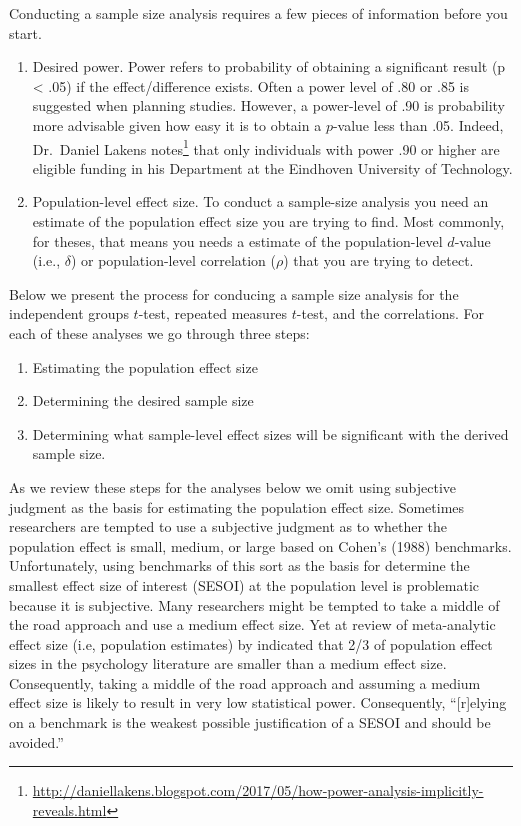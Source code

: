 \documentclass[
]{krantz}
\providecommand{\tightlist}{%
  \setlength{\itemsep}{0pt}\setlength{\parskip}{0pt}}
\renewcommand{\href}[2]{#2\footnote{\url{#1}}}
\begin{document}
Conducting a sample size analysis requires a few pieces of information before you start.

\begin{enumerate}
\def\labelenumi{\arabic{enumi}.}
\item
  Desired power. Power refers to probability of obtaining a significant result (p \textless{} .05) if the effect/difference exists. Often a power level of .80 or .85 is suggested when planning studies. However, a power-level of .90 is probability more advisable given how easy it is to obtain a \(p\)-value less than .05. Indeed, Dr.~Daniel Lakens \href{http://daniellakens.blogspot.com/2017/05/how-power-analysis-implicitly-reveals.html}{notes} that only individuals with power .90 or higher are eligible funding in his Department at the Eindhoven University of Technology.
\item
  Population-level effect size. To conduct a sample-size analysis you need an estimate of the population effect size you are trying to find. Most commonly, for theses, that means you needs a estimate of the population-level \(d\)-value (i.e., \(\delta\)) or population-level correlation (\(\rho\)) that you are trying to detect.
\end{enumerate}

Below we present the process for conducing a sample size analysis for the independent groups \(t\)-test, repeated measures \(t\)-test, and the correlations. For each of these analyses we go through three steps:

\begin{enumerate}
\def\labelenumi{\arabic{enumi}.}
\tightlist
\item
  Estimating the population effect size
\item
  Determining the desired sample size
\item
  Determining what sample-level effect sizes will be significant with the derived sample size.
\end{enumerate}

As we review these steps for the analyses below we omit using subjective judgment as the basis for estimating the population effect size. Sometimes researchers are tempted to use a subjective judgment as to whether the population effect is small, medium, or large based on Cohen's (1988) benchmarks. Unfortunately, using benchmarks of this sort as the basis for determine the smallest effect size of interest (SESOI) at the population level is problematic because it is subjective. Many researchers might be tempted to take a middle of the road approach and use a medium effect size. Yet at review of meta-analytic effect size (i.e, population estimates) by \citep{hemphill2003interpreting} indicated that 2/3 of population effect sizes in the psychology literature are smaller than a medium effect size. Consequently, taking a middle of the road approach and assuming a medium effect size is likely to result in very low statistical power. Consequently, ``{[}r{]}elying on a benchmark is the weakest possible justification of a SESOI and should be avoided.'' \citep[p.~262,][]{lakens2018equivalence}
\end{document}
